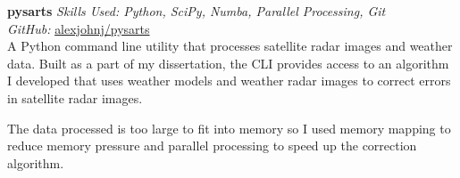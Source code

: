 \textbf{pysarts}  \newline
\textit{Skills Used: Python, SciPy, Numba, Parallel Processing, Git}\\
\textit{GitHub:} \href{https://github.com/\myweb/pysarts}{alexjohnj/pysarts}\\
A Python command line utility that processes satellite radar images and weather
data. Built as a part of my dissertation, the CLI provides access to an
algorithm I developed that uses weather models and weather radar images to
correct errors in satellite radar images.

The data processed is too large to fit into memory so I used memory mapping to
reduce memory pressure and parallel processing to speed up the correction
algorithm.

